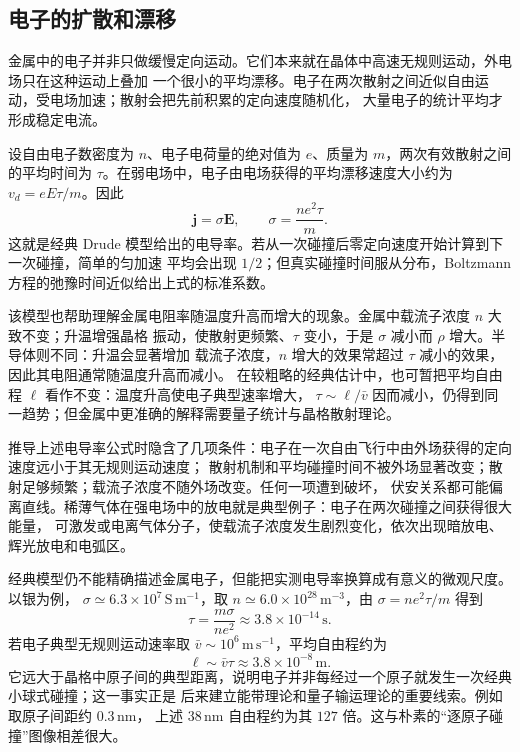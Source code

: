 \subsection*{电子的扩散和漂移}

金属中的电子并非只做缓慢定向运动。它们本来就在晶体中高速无规则运动，外电场只在这种运动上叠加
一个很小的平均漂移。电子在两次散射之间近似自由运动，受电场加速；散射会把先前积累的定向速度随机化，
大量电子的统计平均才形成稳定电流。

\drudeFigure
{}

设自由电子数密度为 $n$、电子电荷量的绝对值为 $e$、质量为 $m$，两次有效散射之间的平均时间为
$\tau$。在弱电场中，电子由电场获得的平均漂移速度大小约为 $v_d=eE\tau/m$。因此
\begin{equation}
  \boxed{\boldsymbol j=\sigma\boldsymbol E,\qquad
  \sigma=\frac{ne^2\tau}{m}}.
\end{equation}
这就是经典 Drude 模型给出的电导率。若从一次碰撞后零定向速度开始计算到下一次碰撞，简单的匀加速
平均会出现 $1/2$；但真实碰撞时间服从分布，Boltzmann 方程的弛豫时间近似给出上式的标准系数。

该模型也帮助理解金属电阻率随温度升高而增大的现象。金属中载流子浓度 $n$ 大致不变；升温增强晶格
振动，使散射更频繁、$\tau$ 变小，于是 $\sigma$ 减小而 $\rho$ 增大。半导体则不同：升温会显著增加
载流子浓度，$n$ 增大的效果常超过 $\tau$ 减小的效果，因此其电阻通常随温度升高而减小。
在较粗略的经典估计中，也可暂把平均自由程 $\ell$ 看作不变：温度升高使电子典型速率增大，
$\tau\sim\ell/\bar v$ 因而减小，仍得到同一趋势；但金属中更准确的解释需要量子统计与晶格散射理论。

推导上述电导率公式时隐含了几项条件：电子在一次自由飞行中由外场获得的定向速度远小于其无规则运动速度；
散射机制和平均碰撞时间不被外场显著改变；散射足够频繁；载流子浓度不随外场改变。任何一项遭到破坏，
伏安关系都可能偏离直线。稀薄气体在强电场中的放电就是典型例子：电子在两次碰撞之间获得很大能量，
可激发或电离气体分子，使载流子浓度发生剧烈变化，依次出现暗放电、辉光放电和电弧区。

\gasDischargeFigure
{}

经典模型仍不能精确描述金属电子，但能把实测电导率换算成有意义的微观尺度。以银为例，
$\sigma\simeq6.3\times10^7\,\mathrm{S\,m^{-1}}$，取
$n\simeq6.0\times10^{28}\,\mathrm{m^{-3}}$，由 $\sigma=ne^2\tau/m$ 得到
\begin{equation}
  \boxed{\tau=\frac{m\sigma}{ne^2}\approx3.8\times10^{-14}\,\mathrm s}.
\end{equation}
若电子典型无规则运动速率取 $\bar v\sim10^6\,\mathrm{m\,s^{-1}}$，平均自由程约为
\begin{equation}
  \boxed{\ell\sim\bar v\tau\approx3.8\times10^{-8}\,\mathrm m}.
\end{equation}
它远大于晶格中原子间的典型距离，说明电子并非每经过一个原子就发生一次经典小球式碰撞；这一事实正是
后来建立能带理论和量子输运理论的重要线索。例如取原子间距约 $0.3\,\mathrm{nm}$，
上述 $38\,\mathrm{nm}$ 自由程约为其 $127$ 倍。这与朴素的“逐原子碰撞”图像相差很大。


